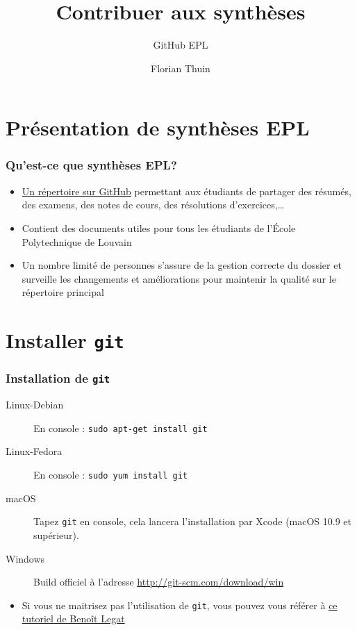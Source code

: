 \documentclass{beamer}
\title{Contribuer aux synthèses}
\subtitle{GitHub EPL}
\author{Florian Thuin}
\institute{École Polytechnique de Louvain}
\begin{document}
\begin{frame}[plain]
	\titlepage
\end{frame}



\section{Présentation de synthèses EPL}

\begin{frame}
	\frametitle{Qu'est-ce que synthèses EPL?}
		\begin{itemize}
 			\item \href{https://github.com/Gp2mv3/Syntheses}{Un répertoire sur GitHub} permettant aux étudiants de
 			    partager des résumés, des examens, des notes de cours,
 			    des résolutions d'exercices,\ldots
 			\item Contient des documents utiles pour tous les étudiants
 			    de l'École Polytechnique de Louvain
 			\item Un nombre limité de personnes s'assure de la gestion
 			    correcte du dossier et surveille les changements et
 			    améliorations pour maintenir la qualité sur le répertoire
 			    principal
 		\end{itemize}
\end{frame}

\section{Installer \texttt{git}}

\begin{frame}[fragile]
    \frametitle{Installation de \lstinline|git|}
    \begin{description}
        \item[Linux-Debian] En console : \lstinline|sudo apt-get install git|
        \item[Linux-Fedora] En console : \lstinline|sudo yum install git|
        \item[macOS] Tapez \lstinline|git| en console, cela lancera
            l'installation par Xcode (macOS 10.9 et supérieur).
        \item[Windows] Build officiel à l'adresse
            \url{http://git-scm.com/download/win}
    \end{description}
    \begin{itemize}
        \item Si vous ne maitrisez pas l'utilisation de \lstinline|git|, vous pouvez
            vous référer à
            \href{http://sites.uclouvain.be/SystInfo/notes/Outils/html/git.html}{ce
            tutoriel de Benoît Legat}
    \end{itemize}
\end{frame}
\end{document}
